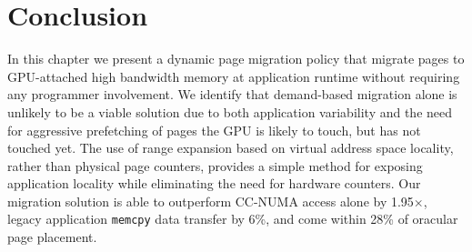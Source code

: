 \section{Conclusion}
%
In this chapter we present a dynamic page migration policy that migrate pages to
GPU-attached high bandwidth memory at application runtime without requiring any
programmer involvement.  
We identify that demand-based migration alone is unlikely to be a viable
solution due to both application variability and the need for aggressive
prefetching of pages the GPU is likely to touch, but has not touched yet.  The
use of range expansion based on virtual address space locality, rather than
physical page counters, provides a simple method for exposing application
locality while eliminating the need for hardware counters.  
Our migration solution is able to outperform CC-NUMA access alone by
1.95$\times$, legacy application {\tt memcpy} data transfer by 6\%, and come
within 28\% of oracular page placement.

